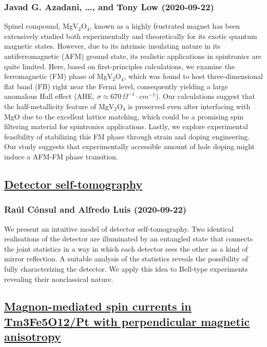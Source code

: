 {\subsubsection*{Javad G. Azadani, \dots, and Tony Low (2020-09-22)}
Spinel compound, MgV$_2$O$_4$, known as a highly frustrated magnet has been
extensively studied both experimentally and theoretically for its exotic
quantum magnetic states. However, due to its intrinsic insulating nature in its
antiferromagnetic (AFM) ground state, its realistic applications in spintronics
are quite limited. Here, based on first-principles calculations, we examine the
ferromagnetic (FM) phase of MgV$_2$O$_4$, which was found to host
three-dimensional flat band (FB) right near the Fermi level, consequently
yielding a large anomalous Hall effect (AHE, $\sigma \approx
670\,\Omega^{-1}\cdot cm^{-1}$). Our calculations suggest that the
half-metallicity feature of MgV$_2$O$_4$ is preserved even after interfacing
with MgO due to the excellent lattice matching, which could be a promising spin
filtering material for spintronics applications. Lastly, we explore
experimental feasibility of stabilizing this FM phase through strain and doping
engineering. Our study suggests that experimentally accessible amount of hole
doping might induce a AFM-FM phase transition.

\subsection*{\href{http://arxiv.org/abs/2009.10314v1}{Detector self-tomography}}
\subsubsection*{Raúl Cónsul and Alfredo Luis (2020-09-22)}
We present an intuitive model of detector self-tomography. Two identical
realisations of the detector are illuminated by an entangled state that
connects the joint statistics in a way in which each detector sees the other as
a kind of mirror reflection. A suitable analysis of the statistics reveals the
possibility of fully characterizing the detector. We apply this idea to
Bell-type experiments revealing their nonclassical nature.

\subsection*{\href{http://arxiv.org/abs/2009.10299v1}{Magnon-mediated spin currents in Tm3Fe5O12/Pt with perpendicular  magnetic anisotropy}}
}
